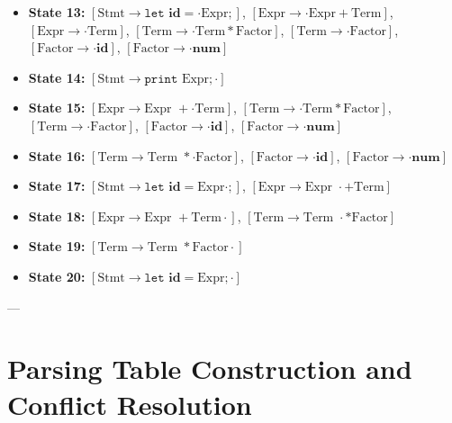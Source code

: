 \documentclass[11pt,a4paper]{article}
\begin{document}
\begin{itemize}
    \item \textbf{State 13:} $[\text{Stmt} \to \texttt{let } \mathbf{id} = \cdot \text{Expr} ;]$, $[\text{Expr} \to \cdot \text{Expr} + \text{Term}]$, $[\text{Expr} \to \cdot \text{Term}]$, $[\text{Term} \to \cdot \text{Term} * \text{Factor}]$, $[\text{Term} \to \cdot \text{Factor}]$, $[\text{Factor} \to \cdot \mathbf{id}]$, $[\text{Factor} \to \cdot \mathbf{num}]$
    \item \textbf{State 14:} $[\text{Stmt} \to \texttt{print } \text{Expr} ; \cdot]$
    \item \textbf{State 15:} $[\text{Expr} \to \text{Expr } + \cdot \text{Term}]$, $[\text{Term} \to \cdot \text{Term} * \text{Factor}]$, $[\text{Term} \to \cdot \text{Factor}]$, $[\text{Factor} \to \cdot \mathbf{id}]$, $[\text{Factor} \to \cdot \mathbf{num}]$
    \item \textbf{State 16:} $[\text{Term} \to \text{Term } * \cdot \text{Factor}]$, $[\text{Factor} \to \cdot \mathbf{id}]$, $[\text{Factor} \to \cdot \mathbf{num}]$
    \item \textbf{State 17:} $[\text{Stmt} \to \texttt{let } \mathbf{id} = \text{Expr} \cdot ;]$, $[\text{Expr} \to \text{Expr } \cdot + \text{Term}]$
    \item \textbf{State 18:} $[\text{Expr} \to \text{Expr } + \text{Term} \cdot]$, $[\text{Term} \to \text{Term } \cdot * \text{Factor}]$
    \item \textbf{State 19:} $[\text{Term} \to \text{Term } * \text{Factor} \cdot]$
    \item \textbf{State 20:} $[\text{Stmt} \to \texttt{let } \mathbf{id} = \text{Expr} ; \cdot]$
\end{itemize}

---

\section{Parsing Table Construction and Conflict Resolution}
\end{document}
